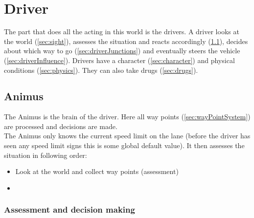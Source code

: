 
\section{Driver}
\label{sec:driver}

The part that does all the acting in this world is the drivers. A
driver looks at the world (\ref{sec:sight}), assesses the situation
and reacts accordingly (\ref{sec:animus}), decides about which
way to go (\ref{sec:driverJunctions}) and eventually steers the
vehicle (\ref{sec:driverInfluence}). Drivers have a character
(\ref{sec:character}) and physical conditions (\ref{sec:physics}). They
can also take drugs (\ref{sec:drugs}). \\

\subsection{Animus}
\label{sec:animus}

The Animus is the brain of the driver. Here all way points 
(\ref{sec:wayPointSystem}) are processed and decisions are made. \\

\noindent The Animus only knows the current speed limit on the lane 
(before the driver has seen any speed limit signs this is some global
default value). It then assesses the situation in following order:

\begin{itemize}
\item Look at the world and collect way points (assessment)
\item 
\end{itemize}

\subsubsection{Assessment and decision making}


